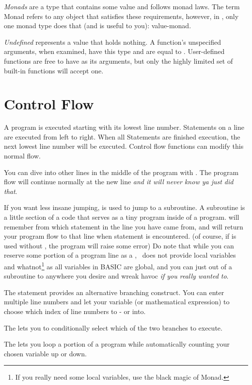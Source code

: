 \emph{Monads} are a type that contains some value and follows monad laws. The term Monad refers to any object that satisfies these requirements, however, in \tbas, only one monad type does that (and is useful to you): value-monad.

\emph{Undefined} represents a value that holds nothing. A function's unspecified arguments, when examined, have this type and are equal to . User-defined functions are free to have  as its arguments, but only the highly limited set of built-in functions will accept one.

\section{Control Flow}

A program is executed starting with its lowest line number. Statements on a line are executed from left to right. When all Statements are finished execution, the next lowest line number will be executed. Control flow functions can modify this normal flow.

You can dive into other lines in the middle of the program with . The program flow will continue normally at the new line \emph{and it will never know ya just did that}.

If you want less insane jumping,  is used to jump to a subroutine. A subroutine is a little section of a code that serves as a tiny program inside of a program.  will remember from which statement in the line you have came from, and will return your program flow to that line when  statement is encountered. (of course, if  is used without , the program will raise some error) Do note that while you can reserve some portion of a program line as a , \tbas\ does not provide local variables and whatnot\footnote{If you really need some local variables, use the black magic of Monad.} as all variables in BASIC are global, and you can just  out of a subroutine to anywhere you desire and wreak havoc \emph{if you really wanted to}.

The  statement provides an alternative branching construct. You can enter multiple line numbers and let your variable (or mathematical expression) to choose which index of line numbers to - or  into.

The  lets you to conditionally select which of the two branches to execute.

The  lets you loop a portion of a program while automatically counting your chosen variable up or down.
